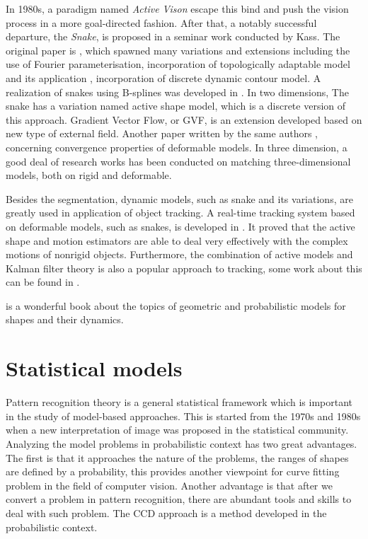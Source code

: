 In 1980s, a paradigm named \textit{Active Vison}\cite{aloimonos1988active} escape this bind and
push the vision process in a more goal-directed fashion. After that, a
notably successful departure, the \textit{Snake}, is proposed in a
seminar work conducted by Kass. The original paper is
\cite{kass1988snakes}, which spawned many variations
and extensions including the use of Fourier parameterisation\cite{scott1987alternative}, incorporation
of topologically adaptable model\cite{mcinerney1995topologically} and
its application \cite{mcinemey1999topology}, incorporation of discrete
dynamic contour model\cite{lobregt1995discrete}. A realization of snakes
using B-splines was developed in \cite{brigger2000b}. In two
dimensions, The snake has a variation named active shape
model\cite{cootes1995active}, which is a discrete version of this
approach. Gradient Vector Flow\cite{xu1998snakes}, or GVF, is an extension developed
based on new type of external field. Another paper written by the same
authors \cite{xu2000gradient}, concerning convergence properties of
deformable models. In three dimension, a good deal of research works has
been conducted on matching three-dimensional models, both on rigid
\cite{harris1993tracking} and
deformable\cite{terzopoulos1991dynamic}. 

Besides the segmentation,
dynamic models, such as snake and its variations, are greatly used in application of object
tracking. A real-time tracking system based on deformable models, such
as snakes, is developed
in \cite{terzopoulos1992tracking}. It proved that the active shape and
motion estimators are able to deal very effectively with the complex
motions of nonrigid objects. Furthermore, the combination of active
models and Kalman filter theory is also a popular approach to
tracking, some work about this can be found in
\cite{schick1991simultaneous}.

\cite{blake1998active} is a wonderful book about the topics of
geometric and probabilistic models  for shapes and their dynamics.

\section{Statistical models}
\label{sec:sm}
Pattern recognition theory is a general statistical framework which is
important in the study of model-based approaches. This is started from the 1970s
and 1980s when a new interpretation of image was proposed in the
statistical community.  Analyzing the model problems in probabilistic
context has two great advantages. The first is that it approaches the
nature of the problems, the ranges of shapes are defined by a
probability, this provides another viewpoint for curve fitting problem
in the field of computer vision. Another advantage is that after we
convert a problem in pattern recognition, there are abundant tools and
skills to deal with such problem. 
The CCD approach is a method developed in the probabilistic context. 

